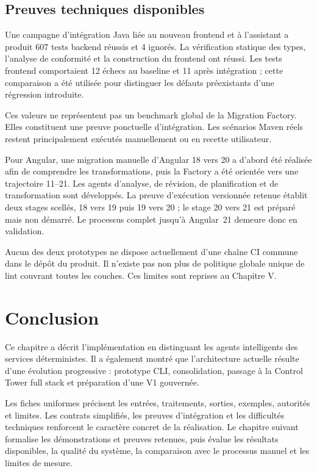 \subsection{Preuves techniques disponibles}

Une campagne d'intégration Java liée au nouveau frontend et à l'assistant a produit 607 tests backend réussis et 4 ignorés. La vérification statique des types, l'analyse de conformité et la construction du frontend ont réussi. Les tests frontend comportaient 12 échecs au baseline et 11 après intégration ; cette comparaison a été utilisée pour distinguer les défauts préexistants d'une régression introduite.

Ces valeurs ne représentent pas un benchmark global de la Migration Factory. Elles constituent une preuve ponctuelle d'intégration. Les scénarios Maven réels restent principalement exécutés manuellement ou en recette utilisateur.

Pour Angular, une migration manuelle d'Angular 18 vers 20 a d'abord été réalisée afin de comprendre les transformations, puis la Factory a été orientée vers une trajectoire 11--21. Les agents d'analyse, de révision, de planification et de transformation sont développés. La preuve d'exécution versionnée retenue établit deux stages scellés, 18 vers 19 puis 19 vers 20 ; le stage 20 vers 21 est préparé mais non démarré. Le processus complet jusqu'à Angular~21 demeure donc en validation.

Aucun des deux prototypes ne dispose actuellement d'une chaîne CI commune dans le dépôt du produit. Il n'existe pas non plus de politique globale unique de lint couvrant toutes les couches. Ces limites sont reprises au Chapitre V.

\section*{Conclusion}

Ce chapitre a décrit l'implémentation en distinguant les agents intelligents des services déterministes. Il a également montré que l'architecture actuelle résulte d'une évolution progressive : prototype CLI, consolidation, passage à la Control Tower full stack et préparation d'une V1 gouvernée.

Les fiches uniformes précisent les entrées, traitements, sorties, exemples, autorités et limites. Les contrats simplifiés, les preuves d'intégration et les difficultés techniques renforcent le caractère concret de la réalisation. Le chapitre suivant formalise les démonstrations et preuves retenues, puis évalue les résultats disponibles, la qualité du système, la comparaison avec le processus manuel et les limites de mesure.
